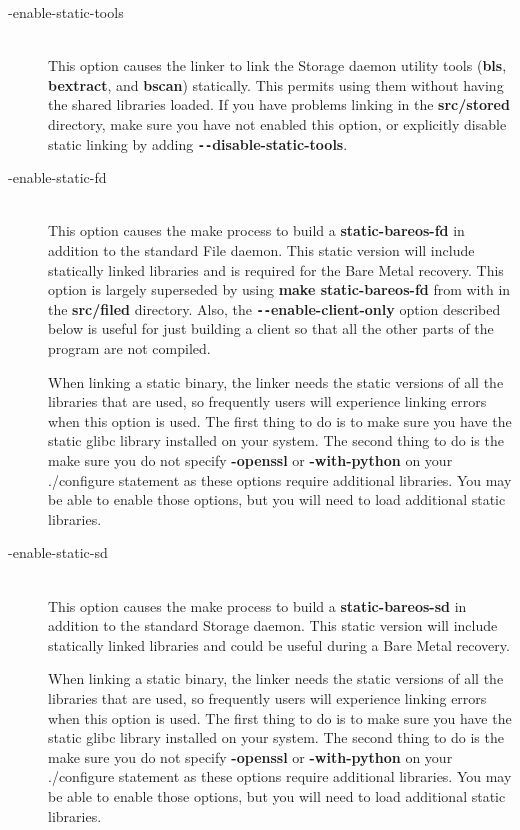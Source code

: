 \begin{description}
\item [ {-}{\-}enable-static-tools] \hfill \\
This option causes the linker to link the Storage daemon utility tools
({\bf bls}, {\bf bextract}, and {\bf bscan}) statically.  This permits
using them without having the shared libraries loaded.  If you have
problems linking in the {\bf src/stored} directory, make sure you have
not enabled this option, or explicitly disable static linking by adding
{\bf \verb:--:disable-static-tools}.

\item [ {-}{\-}enable-static-fd] \hfill \\
This option causes the make process to build a {\bf static-bareos-fd} in
addition to the standard File daemon.  This static version will include
statically linked libraries and is required for the Bare Metal recovery.
This option is largely superseded by using {\bf make static-bareos-fd}
from with in the {\bf src/filed} directory.  Also, the {\bf
\verb:--:enable-client-only} option described below is useful for just
building a client so that all the other parts of the program are not
compiled.

When linking a static binary, the linker needs the static versions
of all the libraries that are used, so frequently users will
experience linking errors when this option is used. The first
thing to do is to make sure you have the static glibc library
installed on your system. The second thing to do is the make sure
you do not specify {\bf {-}{\-}openssl} or {\bf {-}{\-}with-python}
on your ./configure statement as these options require additional
libraries. You may be able to enable those options, but you will
need to load additional static libraries.

\item [ {-}{\-}enable-static-sd] \hfill \\
This option causes the make process to build a {\bf static-bareos-sd} in
addition to the standard Storage daemon.  This static version will
include statically linked libraries and could be useful during a Bare
Metal recovery.

When linking a static binary, the linker needs the static versions
of all the libraries that are used, so frequently users will
experience linking errors when this option is used. The first
thing to do is to make sure you have the static glibc library
installed on your system. The second thing to do is the make sure
you do not specify {\bf {-}{\-}openssl} or {\bf {-}{\-}with-python}
on your ./configure statement as these options require additional
libraries. You may be able to enable those options, but you will
need to load additional static libraries.


\end{description}
